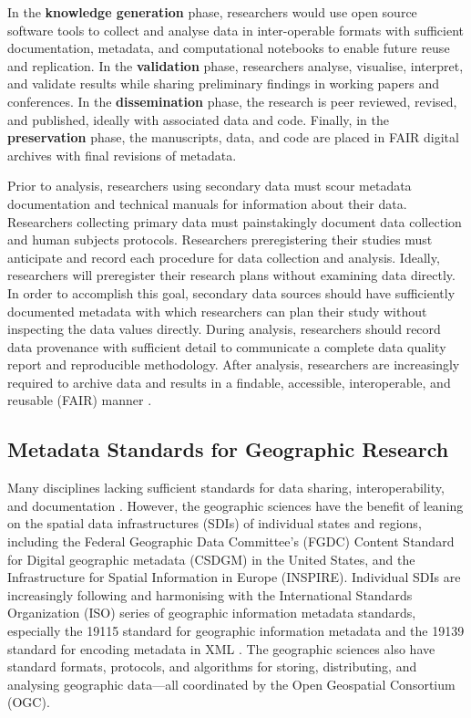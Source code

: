 \documentclass{isprs} %
\begin{document}
In the \textbf{knowledge generation} phase, researchers would use open source software tools to collect and analyse data in inter-operable formats with sufficient documentation, metadata, and computational notebooks to enable future reuse and replication. 
In the \textbf{validation} phase, researchers analyse, visualise, interpret, and validate results while sharing preliminary findings in working papers and conferences.
In the \textbf{dissemination} phase, the research is peer reviewed, revised, and published, ideally with associated data and code.
Finally, in the \textbf{preservation} phase, the manuscripts, data, and code are placed in FAIR digital archives with final revisions of metadata.

Prior to analysis, researchers using secondary data must scour metadata documentation and technical manuals for information about their data.
Researchers collecting primary data must painstakingly document data collection and human subjects protocols.
Researchers preregistering their studies must anticipate and record each procedure for data collection and analysis. 
Ideally, researchers will preregister their research plans without examining data directly.
In order to accomplish this goal, secondary data sources should have sufficiently documented metadata with which researchers can plan their study without inspecting the data values directly.
During analysis, researchers should record data provenance with sufficient detail to communicate a complete data quality report and reproducible methodology.
After analysis, researchers are increasingly required to archive data and results in a findable, accessible, interoperable, and reusable (FAIR) manner \citep{Wilkinson2016}.

\subsection{Metadata Standards for Geographic Research}\label{sec:Metadata}

Many disciplines lacking sufficient standards for data sharing, interoperability, and documentation \citep{NASEM2019}.
However, the geographic sciences have the benefit of leaning on the spatial data infrastructures (SDIs) of individual states and regions, including the Federal Geographic Data Committee's (FGDC) Content Standard for Digital geographic metadata (CSDGM) in the United States, and the Infrastructure for Spatial Information in Europe (INSPIRE).
Individual SDIs are increasingly following and harmonising with the International Standards Organization (ISO) series of geographic information metadata standards, especially the 19115 standard for geographic information metadata \citep{ISO2014} and the 19139 standard for encoding metadata in XML \citep{ISO2019}.
The geographic sciences also have standard formats, protocols, and algorithms for storing, distributing, and analysing geographic data---all coordinated by the Open Geospatial Consortium (OGC).
\end{document}

